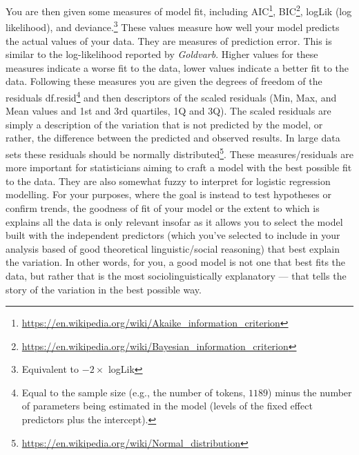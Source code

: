 \documentclass[
  10pt,
  letterpaper]{article}
\renewcommand\texttt[1]{{\ttfamily\color{BrickRed}#1}}
\DeclareRobustCommand{\href}[2]{#2\footnote{\url{#1}}}
\begin{document}
You are then given some measures of model fit, including
\href{https://en.wikipedia.org/wiki/Akaike_information_criterion}{\texttt{AIC}},
\href{https://en.wikipedia.org/wiki/Bayesian_information_criterion}{\texttt{BIC}},
\texttt{logLik} (log likelihood), and \texttt{deviance}.\footnote{Equivalent
  to \(-2 \times\) \texttt{logLik}} These values measure how well your
model predicts the actual values of your data. They are measures of
prediction error. This is similar to the log-likelihood reported by
\emph{Goldvarb}. Higher values for these measures indicate a worse fit
to the data, lower values indicate a better fit to the data. Following
these measures you are given the degrees of freedom of the residuals
\texttt{df.resid}\footnote{Equal to the sample size (e.g., the number of
  tokens, \(1189\)) minus the number of parameters being estimated in
  the model (levels of the fixed effect predictors plus the intercept).}
and then descriptors of the scaled residuals (\texttt{Min},
\texttt{Max}, and \texttt{Mean} values and 1st and 3rd quartiles,
\texttt{1Q} and \texttt{3Q}). The scaled residuals are simply a
description of the variation that is not predicted by the model, or
rather, the difference between the predicted and observed results. In
large data sets these residuals should be
\href{https://en.wikipedia.org/wiki/Normal_distribution}{normally
distributed}. These measures/residuals are more important for
statisticians aiming to craft a model with the best possible fit to the
data. They are also somewhat fuzzy to interpret for logistic regression
modelling. For your purposes, where the goal is instead to test
hypotheses or confirm trends, the goodness of fit of your model or the
extent to which is explains all the data is only relevant insofar as it
allows you to select the model built with the independent predictors
(which you've selected to include in your analysis based of good
theoretical linguistic/social reasoning) that best explain the
variation. In other words, for you, a good model is not one that best
fits the data, but rather that is the most sociolinguistically
explanatory --- that tells the story of the variation in the best
possible way.
\end{document}
